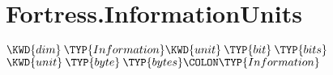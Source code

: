 \section{Fortress.InformationUnits}

\begin{Fortress}
\(\KWD{dim}\mskip 4mu plus 4mu\TYP{Information} \KWD{unit}\mskip 4mu plus 4mu\TYP{bit}\mskip 4mu plus 4mu\TYP{bits}\)\\
\(\KWD{unit}\mskip 4mu plus 4mu\TYP{byte}\mskip 4mu plus 4mu\TYP{bytes}\COLON \TYP{Information}\)
\end{Fortress}
